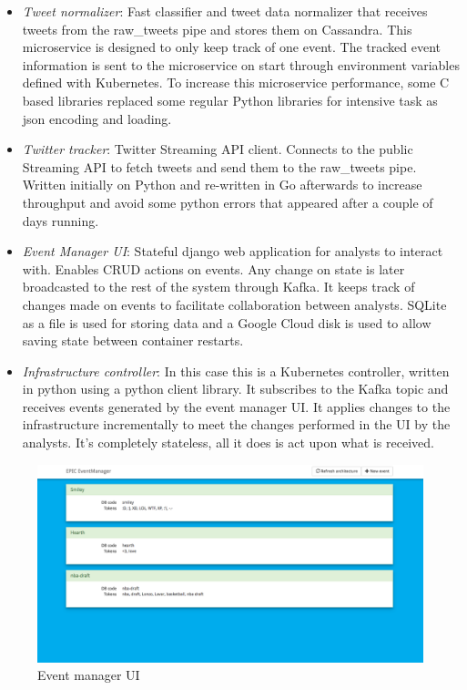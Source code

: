 \begin{itemize}
	\item \textit{Tweet normalizer}: Fast classifier and tweet data normalizer that receives tweets from the raw\_tweets pipe and stores them on Cassandra. This microservice is designed to only keep track of one event. The tracked event information is sent to the microservice on start through environment variables defined with Kubernetes. To increase this microservice performance, some C based libraries replaced some regular Python libraries for intensive task as json encoding and loading. 
	\item \textit{Twitter tracker}: Twitter Streaming API client. Connects to the public Streaming API to fetch tweets and send them to the raw\_tweets pipe.  Written initially on Python and re-written in Go afterwards to increase throughput and avoid some python errors that appeared after a couple of days running.
	\item \textit{Event Manager UI}: Stateful django web application for analysts to interact with. Enables CRUD actions on events. Any change on state is later broadcasted to the rest of the system through Kafka. It keeps track of changes made on events to facilitate collaboration between analysts. SQLite as a file is used for storing data and a Google Cloud disk is used to allow saving state between container restarts.
	\item \textit{Infrastructure controller}: In this case this is a Kubernetes controller, written in python using a python client library. It subscribes to the Kafka topic and receives events generated by the event manager UI. It applies changes to the infrastructure incrementally to meet the changes performed in the UI by the analysts. It’s completely stateless, all it does is act upon what is received. 
\end{itemize}


\begin{figure}
\centering
\includegraphics[width=\textwidth]{Figures/eventmanager}
\decoRule
\caption[Event Manager UI]{Event manager UI}
\label{fig:eventmanager}
\end{figure}

